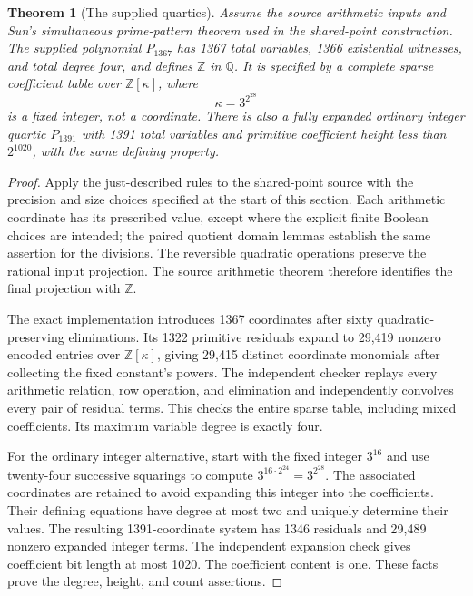 \documentclass[11pt]{article}
\newtheorem{theorem}{Theorem}[section]
\theoremstyle{definition}
\begin{document}
\begin{theorem}[The supplied quartics]\label{thm:quartic-1367}
Assume the source arithmetic inputs and Sun's simultaneous prime-pattern
theorem used in the shared-point construction.  The supplied polynomial
$P_{1367}$ has 1367 total variables, 1366 existential witnesses, and total
degree four, and defines $\mathbb Z$ in $\mathbb Q$.  It is specified by
a complete sparse coefficient table over $\mathbb Z[\kappa]$, where
\[
                         \kappa=3^{2^{28}}
\]
is a fixed integer, not a coordinate.  There is also a fully expanded
ordinary integer quartic $P_{1391}$ with 1391 total variables and primitive
coefficient height less than $2^{1020}$, with the same defining property.
\end{theorem}
\begin{proof}
Apply the just-described rules to the shared-point source with the
precision and size choices specified at the start of this section.
Each arithmetic coordinate has its prescribed value, except where the
explicit finite Boolean choices are intended; the paired quotient domain
lemmas establish the same assertion for the divisions.  The reversible
quadratic operations preserve the rational input projection.  The source
arithmetic theorem therefore identifies the final projection with
$\mathbb Z$.

The exact implementation introduces 1367 coordinates after sixty
quadratic-preserving eliminations.  Its 1322 primitive residuals expand
to 29,419 nonzero encoded entries over $\mathbb Z[\kappa]$, giving
29,415 distinct coordinate monomials after collecting the fixed
constant's powers. The independent checker
replays every arithmetic relation, row operation, and elimination and
independently convolves every pair of residual terms.  This checks the
entire sparse table, including mixed coefficients.  Its maximum variable
degree is exactly four.

For the ordinary integer alternative, start with the fixed integer
$3^{16}$ and use twenty-four successive squarings to compute
$3^{16\cdot2^{24}}=3^{2^{28}}$.  The associated coordinates are retained
to avoid expanding this integer into the coefficients.  Their defining
equations have degree at most two and uniquely determine their values.
The resulting 1391-coordinate system has 1346 residuals and 29,489
nonzero expanded integer terms.  The independent expansion check gives
coefficient bit length at most 1020.  The coefficient content is one.
These facts prove the degree, height, and count assertions.
\end{proof}
\end{document}
